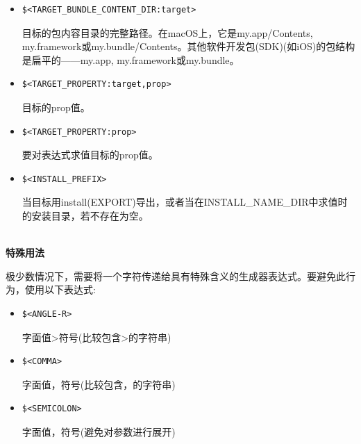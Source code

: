\begin{itemize}
\item 
\begin{lstlisting}[style=styleCMake]
$<TARGET_BUNDLE_CONTENT_DIR:target>
\end{lstlisting}

目标的包内容目录的完整路径。在macOS上，它是my.app/Contents, my.framework或my.bundle/Contents。其他软件开发包(SDK)(如iOS)的包结构是扁平的——my.app, my.framework或my.bundle。

\item 
\begin{lstlisting}[style=styleCMake]
$<TARGET_PROPERTY:target,prop>
\end{lstlisting}

目标的prop值。

\item 
\begin{lstlisting}[style=styleCMake]
$<TARGET_PROPERTY:prop>
\end{lstlisting}

要对表达式求值目标的prop值。

\item 
\begin{lstlisting}[style=styleCMake]
$<INSTALL_PREFIX> 
\end{lstlisting}

当目标用install(EXPORT)导出，或者当在INSTALL\_NAME\_DIR中求值时的安装目录，若不存在为空。

\end{itemize}

\hspace*{\fill} \\ %
\noindent
\textbf{特殊用法}

极少数情况下，需要将一个字符传递给具有特殊含义的生成器表达式。要避免此行为，使用以下表达式:

\begin{itemize}
\item 
\begin{lstlisting}[style=styleCMake]
$<ANGLE-R>
\end{lstlisting}

字面值>符号(比较包含>的字符串)

\item 
\begin{lstlisting}[style=styleCMake]
$<COMMA>
\end{lstlisting}

字面值，符号(比较包含，的字符串)

\item 
\begin{lstlisting}[style=styleCMake]
$<SEMICOLON>
\end{lstlisting}

字面值，符号(避免对参数进行展开)
\end{itemize}

